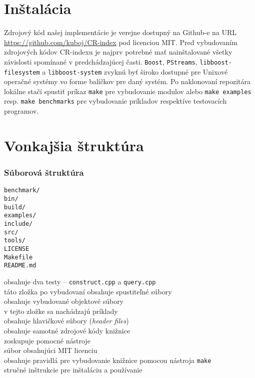 \section{Inštalácia}
Zdrojový kód našej implementácie je verejne dostupný na Github-e na URL \url{https://github.com/kuboj/CR-index} pod licenciou MIT. Pred vybudovaním zdrojových kódov CR-indexu je najprv potrebné mať nainštalované všetky závislosti spomínané v predchádzajúcej časti. \texttt{Boost}, \texttt{PStreams}, \texttt{libboost-filesystem} a \texttt{libboost-system} zvyknú byť široko dostupné pre Unixové operačné systémy vo forme balíčkov pre daný systém. Po naklonovaní repozitára lokálne stačí spustiť príkaz \texttt{make} pre vybudovanie modulov alebo \texttt{make examples} resp. \texttt{make benchmarks} pre vybudovanie príkladov respektíve testovacích programov.

\section{Vonkajšia štruktúra}
\label{sec:vonkajsia_struktura}

\subsubsection{Súborová štruktúra}

\begin{minipage}[t]{0.20\linewidth}
    \vspace{0pt}
    \texttt{benchmark/} \\
    \texttt{bin/} \\
    \texttt{build/} \\
    \texttt{examples/}  \\
    \texttt{include/}   \\
    \texttt{src/}       \\
    \texttt{tools/}     \\
    \texttt{LICENSE}     \\
    \texttt{Makefile}     \\
    \texttt{README.md}
\end{minipage}
\hspace{0.3cm}
\begin{minipage}[t]{0.8\linewidth}
    \vspace{0pt}
    obsahuje dva testy -- \texttt{construct.cpp} a \texttt{query.cpp} \\
    táto zložka po vybudovaní obsahuje spustiteľné súbory \\
    obsahuje vybudované objektové súbory \\
    v tejto zložke sa nachádzajú príklady \\
    obsahuje hlavičkové súbory (\emph{header files}) \\
    obsahuje samotné zdrojové kódy knižnice \\
    zoskupuje pomocné nástroje \\
    súbor obsahujúci MIT licenciu \\
    obsahuje pravidlá pre vybudovanie knižnice pomocou nástroja \texttt{make} \\
    stručné inštrukcie pre inštaláciu a používanie
\end{minipage}

